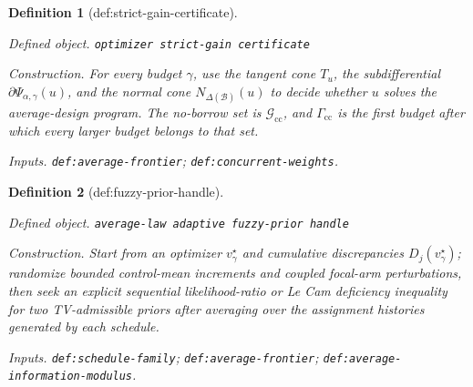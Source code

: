 \documentclass{article}
\newtheorem{definition}{Definition}
\begin{document}
\begin{definition}[def:strict-gain-certificate]\label{def:strict-gain-certificate}
\par\smallskip\noindent\emph{Defined object.} \texttt{optimizer strict-\allowbreak{}gain certificate}
\par\smallskip\noindent\emph{Construction.} For every budget \(\gamma\), use the tangent cone \(T_u\), the subdifferential \(\partial\Psi_{\alpha,\gamma}(u)\), and the normal cone \(N_{\Delta(\mathcal B)}(u)\) to decide whether \(u\) solves the average-design program. The no-borrow set is \(\mathcal G_{\mathrm{cc}}\), and \(\Gamma_{\mathrm{cc}}\) is the first budget after which every larger budget belongs to that set.
\par\smallskip\noindent\emph{Inputs.} \texttt{def:\allowbreak{}average-\allowbreak{}frontier}; \texttt{def:\allowbreak{}concurrent-\allowbreak{}weights}.
\end{definition}

\begin{definition}[def:fuzzy-prior-handle]\label{def:fuzzy-prior-handle}
\par\smallskip\noindent\emph{Defined object.} \texttt{average-\allowbreak{}law adaptive fuzzy-\allowbreak{}prior handle}
\par\smallskip\noindent\emph{Construction.} Start from an optimizer \(v_\gamma^\star\) and cumulative discrepancies \(D_j(v_\gamma^\star)\); randomize bounded control-mean increments and coupled focal-arm perturbations, then seek an explicit sequential likelihood-ratio or Le Cam deficiency inequality for two TV-admissible priors after averaging over the assignment histories generated by each schedule.
\par\smallskip\noindent\emph{Inputs.} \texttt{def:\allowbreak{}schedule-\allowbreak{}family}; \texttt{def:\allowbreak{}average-\allowbreak{}frontier}; \texttt{def:\allowbreak{}average-\allowbreak{}information-\allowbreak{}modulus}.
\end{definition}
\end{document}

